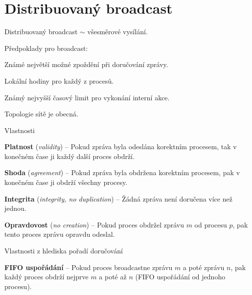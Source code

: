 
\section{Distribuovaný broadcast}

\begin{compactitem}
    \item Distribuovaný broadcast $\sim$ všesměrové vysílání.

    \item Předpoklady pro broadcast: \begin{compactitem}
        \item Známé největší možné zpoždění při doručování zprávy.
        \item Lokální hodiny pro každý z procesů.
        \item Známý nejvyšší časový limit pro vykonání interní akce.
        \item Topologie sítě je obecná.
    \end{compactitem}

    \item Vlastnosti \begin{compactitem}
        \item \textbf{Platnost} (\textit{validity}) -- Pokud zpráva byla odeslána korektním procesem, tak v konečném čase ji každý další proces obdrží.

        \item \textbf{Shoda} (\textit{agreement}) -- Pokud zpráva byla obdržena korektním procesem, pak v konečném čase ji obdrží všechny procesy.

        \item \textbf{Integrita} (\textit{integrity, no duplication}) -- Žádná zpráva není doručena více než jednou.

        \item \textbf{Opravdovost} (\textit{no creation}) -- Pokud proces obdržel zprávu $m$ od procesu $p$, pak tento proces zprávu opravdu odeslal.
    \end{compactitem}

    \item Vlastnosti z hlediska pořadí doručování \begin{compactitem}
        \item \textbf{FIFO uspořádání} -- Pokud proces broadcastne zprávu $m$ a poté zprávu $n$, pak každý proces obdrží nejprve $m$ a poté až $n$ (FIFO uspořádání od jednoho procesu).


\end{compactitem}
\end{compactitem}

